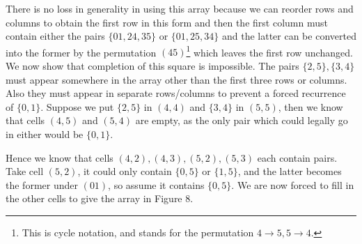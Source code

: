 \documentclass[
  12pt,
  a4paper]{book}
\begin{document}
There is no loss in generality in using this array because we can
reorder rows and columns to obtain the first row in this form and then
the first column must contain either the pairs \(\{01, 24, 35\}\) or
\(\{01, 25, 34\}\) and the latter can be converted into the former by the
permutation \((45)\)\footnote{This is cycle notation, and stands for the permutation
  \(4 \rightarrow 5, 5 \rightarrow 4\).} which leaves the first row unchanged. We now show
that completion of this square is impossible. The pairs
\(\{2,5\},\{3,4\}\) must appear somewhere in the array other than the
first three rows or columns. Also they must appear in separate
rows/columns to prevent a forced recurrence of \(\{0, 1\}\). Suppose we put
\(\{2, 5\}\) in \((4, 4)\) and \(\{3, 4\}\) in \((5, 5)\), then we know that cells
\((4, 5)\) and \((5, 4)\) are empty, as the only pair which could legally go
in either would be \(\{0, 1\}\).

Hence we know that cells \((4, 2), (4, 3), (5, 2), (5, 3)\) each contain pairs.
Take cell \((5, 2)\), it could only contain \(\{0, 5\}\) or \(\{1, 5\}\), and the
latter becomes the former under \((01)\), so assume it contains \(\{0, 5\}\).
We are now forced to fill in the other cells to give the array in Figure
8.
\end{document}
